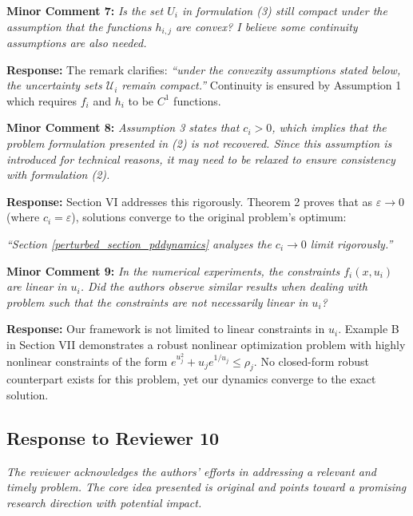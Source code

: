 \documentclass[journal,twoside,web]{ieeecolor}
\begin{document}
\vspace{0.5em}
\noindent\textbf{Minor Comment 7:} \textit{Is the set $U_i$ in formulation (3) still compact under the assumption that the functions $h_{i,j}$ are convex? I believe some continuity assumptions are also needed.}

\noindent\textbf{Response:} The remark clarifies: {\color{revisionblue}\textit{``under the convexity assumptions stated below, the uncertainty sets $\mathcal{U}_i$ remain compact.''}} Continuity is ensured by Assumption 1 which requires $f_i$ and $h_i$ to be $C^1$ functions.

\vspace{0.5em}
\noindent\textbf{Minor Comment 8:} \textit{Assumption 3 states that $c_i > 0$, which implies that the problem formulation presented in (2) is not recovered. Since this assumption is introduced for technical reasons, it may need to be relaxed to ensure consistency with formulation (2).}

\noindent\textbf{Response:} Section VI addresses this rigorously. Theorem 2 proves that as $\varepsilon \to 0$ (where $c_i = \varepsilon$), solutions converge to the original problem's optimum:

{\color{revisionblue}\textit{``Section \ref{perturbed_section_pddynamics} analyzes the $c_i \to 0$ limit rigorously.''}}

\vspace{0.5em}
\noindent\textbf{Minor Comment 9:} \textit{In the numerical experiments, the constraints $f_i(x, u_i)$ are linear in $u_i$. Did the authors observe similar results when dealing with problem such that the constraints are not necessarily linear in $u_i$?}

\noindent\textbf{Response:} Our framework is not limited to linear constraints in $u_i$. Example B in Section VII demonstrates a robust nonlinear optimization problem with highly nonlinear constraints of the form $e^{u_j^2}+u_j e^{1/u_j} \leq \rho_j$. No closed-form robust counterpart exists for this problem, yet our dynamics converge to the exact solution.

\newpage
\subsection*{Response to Reviewer 10}

\noindent\textit{The reviewer acknowledges the authors' efforts in addressing a relevant and timely problem. The core idea presented is original and points toward a promising research direction with potential impact.}
\end{document}
